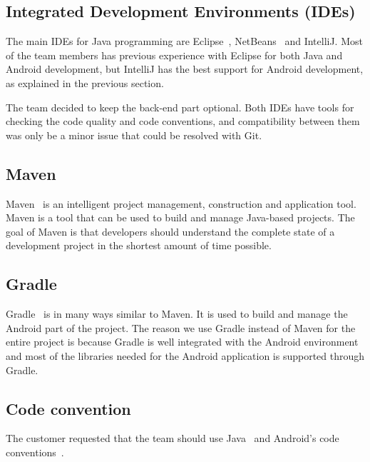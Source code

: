 \subsection{Integrated Development Environments (IDEs)}
The main IDEs for Java programming are Eclipse~\cite{eclipse}, NetBeans~\cite{netbeans} and IntelliJ. Most of the team members has previous experience with Eclipse for both Java and Android development, but IntelliJ has the best support for Android development, as explained in the previous section.

The team decided to keep the back-end part optional. Both IDEs have tools for checking the code quality and code conventions, and compatibility between them was only be a minor issue that could be resolved with Git.

\subsection{Maven}
Maven~\cite{maven} is an intelligent project management, construction and application tool. Maven is a tool that can be used to build and manage Java-based projects. The goal of Maven is that developers should understand the complete state of a development project in the shortest amount of time possible.

\subsection{Gradle}
Gradle~\cite{Gradle} is in many ways similar to Maven. It is used to build and manage the Android part of the project. The reason we use Gradle instead of Maven for the entire project is because Gradle is well integrated with the Android environment and most of the libraries needed for the Android application is supported through Gradle.

\subsection{Code convention}
The customer requested that the team should use Java~\cite{javaconv} and Android's code conventions~\cite{Androidconv}.
